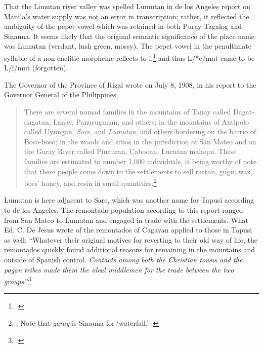 That the Limutan river valley was spelled Lumutan in de los Angeles report on Manila's water supply was not an error in transcription; rather, it reflected the ambiguity of the pepet vowel which was retained in both Puray Tagalog and Sinauna. It seems likely that the original semantic significance of the place name was Lumutan (verdant, lush green, mossy). The pepet vowel in the penultimate syllable of a non-enclitic morpheme reflects to i,\footcite{Himes2002} and thus L/*e/mut came to be L/i/mut (forgotten).

The Governor of the Province of Rizal wrote on July 8, 1908, in his report to the Governor General of the Philippines,
\begin{quote}
There are several nomad families in the mountains of Tanay called Dagat-dagatan, Lanay, Panusugunan, and others; in the mountains of Antipolo called Uyungan, \textit{Sare}, and \textit{Lumutan}, and others bordering on the barrio of Boso-boso; in the woods and sitios in the jurisdiction of San Mateo and on the Garay River called Pinauran, Cabooan, Lucutan malaqui. These families are estimated to number 1,000 individuals, it being worthy of note that these people come down to the settlements to sell rattan, gugu, wax, bees' honey, and resin in small quantities.\footnote{\cite[415]{ReportWar1908}; Note that \textit{garay} is Sinauna for \enquote*{waterfall.} \parencite[42]{Reid1994}.}
\end{quote}

Lumutan is here adjacent to Sare, which was another name for Tapusi according to de los Angeles. The remontado population according to this report ranged from San Mateo to Lumutan and engaged in trade with the settlements. What Ed. C. De Jesus wrote of the remontados of Cagayan applied to those in Tapusi as well: \enquote{Whatever their original motives for reverting to their old way of life, the remontados quickly found additional reasons for remaining in the mountains and outside of Spanish control. \textit{Contacts among both the Christian towns and the pagan tribes made them the ideal middlemen for the trade between the two groups}.}\footcite[116-7, emphasis added]{DeJesus1980}

